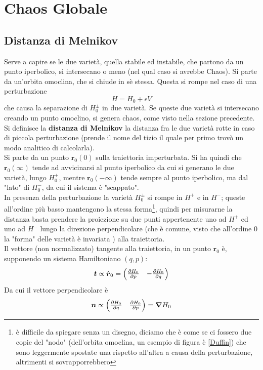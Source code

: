 \documentclass[a4paper,12pt]{article}
\theoremstyle{plain}
\renewcommand{\vec}[1]{{\boldsymbol{#1}}}
\theoremstyle{definition}
\theoremstyle{remark}
\begin{document}
\section{Chaos Globale}
\subsection{Distanza di Melnikov}

Serve a capire se le due varietà, quella stabile ed instabile, che partono da un punto iperbolico, si intersecano o meno (nel qual caso si avrebbe Chaos).
Si parte da un'orbita omoclina, che si chiude in sè stessa. Questa si rompe nel caso di una perturbazione \[H=H_0+\epsilon V\]
che causa la separazione di $H_0^{\pm}$ in due varietà. Se queste due varietà si intersecano creando un punto omoclino, si genera chaos, come visto nella sezione precedente. Si definisce la \textbf{distanza di Melnikov} la distanza fra le due varietà rotte in caso di piccola perturbazione (prende il nome del tizio il quale per primo trovò un modo analitico di calcolarla).
\\Si parte da un punto $\vec{r}_0(0)$ sulla traiettoria imperturbata. Si ha quindi che $\vec{r}_0(\infty)$ tende ad avvicinarsi al punto iperbolico da cui si generano le due varietà, lungo $H_0^+$, mentre $\vec{r}_0(-\infty)$ tende sempre al punto iperbolico, ma dal "lato" di $H_0^-$, da cui il sistema è "scappato".
\\In presenza della perturbazione la varietà $H_0^\pm$ si rompe in $H^+$ e in $H^-$; queste all'ordine più basso mantengono la stessa forma\footnote{è difficile da spiegare senza un disegno, diciamo che è come se ci fossero due copie del "nodo" (dell'orbita omoclina, un esempio di figura è \ref{Duffin}) che sono leggermente spostate una rispetto all'altra a causa della perturbazione, altrimenti si sovrapporrebbero}, quindi per misurarne la distanza  basta prendere la proiezione su due punti appertenente uno ad $H^+$ ed uno ad $H^-$ lungo la direzione perpendicolare (che è comune, visto che all'ordine 0 la "forma" delle varietà è invariata ) alla traiettoria.
\\Il vettore (non normalizzato) tangente alla traiettoria, in un punto $\vec{r}_0$ è, supponendo un sistema Hamiltoniano $(q,p) $:
\[\vec{t}\propto\dot{\vec{r}}_0=\begin{pmatrix}
\pdv{H_0}{p}&
-\pdv{H_0}{q}
\end{pmatrix}	\]
Da cui il vettore perpendicolare è \[\vec{n}\propto	\begin{pmatrix}
\pdv{H_0}{q}&
\pdv{H_0}{p}
\end{pmatrix}	=\vec{\nabla}H_0\]
\end{document}
